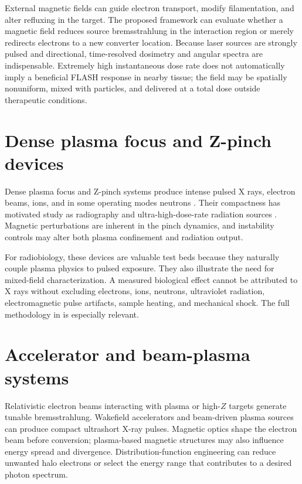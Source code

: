 External magnetic fields can guide electron transport, modify filamentation, and alter refluxing in the target. The proposed framework can evaluate whether a magnetic field reduces source bremsstrahlung in the interaction region or merely redirects electrons to a new converter location. Because laser sources are strongly pulsed and directional, time-resolved dosimetry and angular spectra are indispensable. Extremely high instantaneous dose rate does not automatically imply a beneficial FLASH response in nearby tissue; the field may be spatially nonuniform, mixed with particles, and delivered at a total dose outside therapeutic conditions.

\section{Dense plasma focus and Z-pinch devices}

Dense plasma focus and Z-pinch systems produce intense pulsed X rays, electron beams, ions, and in some operating modes neutrons \cite{haines2011,lee2014}. Their compactness has motivated study as radiography and ultra-high-dose-rate radiation sources \cite{sumini2019,isolan2022}. Magnetic perturbations are inherent in the pinch dynamics, and instability controls may alter both plasma confinement and radiation output.

For radiobiology, these devices are valuable test beds because they naturally couple plasma physics to pulsed exposure. They also illustrate the need for mixed-field characterization. A measured biological effect cannot be attributed to X rays without excluding electrons, ions, neutrons, ultraviolet radiation, electromagnetic pulse artifacts, sample heating, and mechanical shock. The full methodology in  is especially relevant.

\section{Accelerator and beam-plasma systems}

Relativistic electron beams interacting with plasma or high-$Z$ targets generate tunable bremsstrahlung. Wakefield accelerators and beam-driven plasma sources can produce compact ultrashort X-ray pulses. Magnetic optics shape the electron beam before conversion; plasma-based magnetic structures may also influence energy spread and divergence. Distribution-function engineering can reduce unwanted halo electrons or select the energy range that contributes to a desired photon spectrum.

